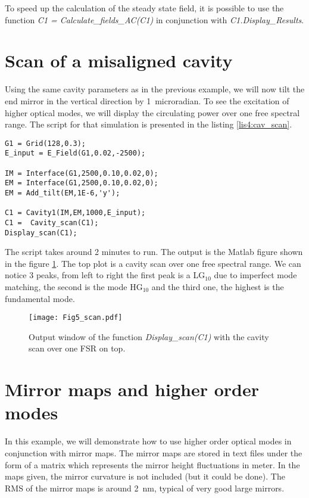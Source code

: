 To speed up the calculation of the steady state field, it is possible to use the function \emph{C1 = Calculate\_fields\_AC(C1)} in conjunction with \emph{C1.Display\_Results}.

\section{Scan of a misaligned cavity}

Using the same cavity parameters as in the previous example, we will now tilt the end mirror in the vertical direction by 1~microradian. To see the excitation of higher optical modes, we will display the circulating power over one free spectral range. The script for that simulation is presented in the listing \ref{lis4:cav_scan}.

\begin{lstlisting}[float=htp,caption=Example of OSCAR script to scan a cavity \label{lis4:cav_scan},frame=lines]
G1 = Grid(128,0.3);
E_input = E_Field(G1,0.02,-2500);

IM = Interface(G1,2500,0.10,0.02,0);
EM = Interface(G1,2500,0.10,0.02,0);
EM = Add_tilt(EM,1E-6,'y');

C1 = Cavity1(IM,EM,1000,E_input);
C1 =  Cavity_scan(C1);
Display_scan(C1);
\end{lstlisting}

The script takes around 2 minutes to run. The output is the Matlab figure shown in the figure \ref{fig4:scan}. The top plot is a cavity scan over one free spectral range. We can notice 3 peaks, from left to right the first peak is a LG$_{10}$ due to imperfect mode matching, the second is the mode HG$_{10}$ and the third one, the highest is the fundamental mode.

\begin{figure}
\begin{center}
\texttt{[image: Fig5\_scan.pdf]}
\end{center}
\caption{\label{fig4:scan} Output window of the function \emph{Display\_scan(C1)} with the cavity scan over one FSR on top.}
\end{figure}

\section{Mirror maps and higher order modes}

In this example, we will demonstrate how to use higher order optical modes in conjunction with mirror maps. The mirror maps are stored in text files under the form of a matrix which represents the mirror height fluctuations in meter. In the maps given, the mirror curvature is not included (but it could be done). The RMS of the mirror maps is around 2~nm, typical of very good large mirrors.

